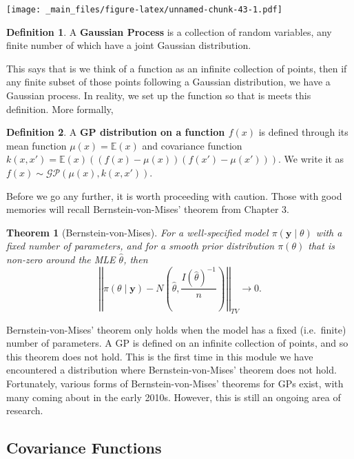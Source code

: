\documentclass[
]{book}
\newtheorem{theorem}{Theorem}[chapter]
\theoremstyle{definition}
\newtheorem{definition}{Definition}[chapter]
\theoremstyle{definition}
\theoremstyle{definition}
\theoremstyle{definition}
\theoremstyle{remark}
\begin{document}
\texttt{[image: \_main\_files/figure-latex/unnamed-chunk-43-1.pdf]}

\begin{definition}
A \textbf{Gaussian Process} is a collection of random variables, any finite number of which have a joint Gaussian distribution.
\end{definition}

This says that is we think of a function as an infinite collection of points, then if any finite subset of those points following a Gaussian distribution, we have a Gaussian process. In reality, we set up the function so that is meets this definition. More formally,

\begin{definition}
A \textbf{GP distribution on a function \(f(x)\)} is defined through its mean function \(\mu(x) = \mathbb{E}(x)\) and covariance function \(k(x, x') = \mathbb{E}(x)\left((f(x) - \mu(x))(f(x') - \mu(x'))\right)\). We write it as \(f(x) \sim \mathcal{GP}(\mu(x), k(x, x'))\).
\end{definition}

Before we go any further, it is worth proceeding with caution. Those with good memories will recall Bernstein-von-Mises' theorem from Chapter 3.

\begin{theorem}[Bernstein-von-Mises]
For a well-specified model \(\pi(\boldsymbol{y} \mid \theta)\) with a fixed number of parameters, and for a smooth prior distribution \(\pi(\theta)\) that is non-zero around the MLE \(\hat{\theta}\), then
\[
\left|\left| \pi(\theta \mid \boldsymbol{y}) - N\left(\hat{\theta}, \frac{I(\hat{\theta})^{-1}}{n}\right) \right|\right|_{TV} \rightarrow 0.
\]
\end{theorem}

Bernstein-von-Mises' theorem only holds when the model has a fixed (i.e.~finite) number of parameters. A GP is defined on an infinite collection of points, and so this theorem does not hold. This is the first time in this module we have encountered a distribution where Bernstein-von-Mises' theorem does not hold. Fortunately, various forms of Bernstein-von-Mises' theorems for GPs exist, with many coming about in the early 2010s. However, this is still an ongoing area of research.

\hypertarget{covariance-functions}{%
\subsection{Covariance Functions}\label{covariance-functions}}
\end{document}
